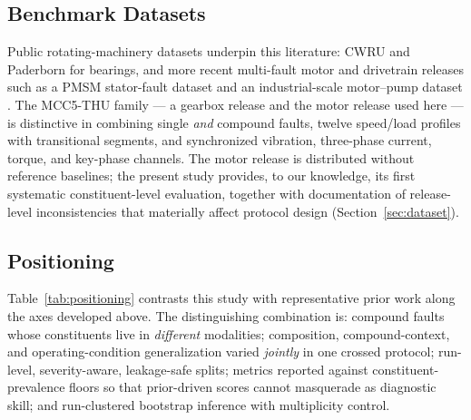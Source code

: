 \subsection{Benchmark Datasets}

Public rotating-machinery datasets underpin this literature: CWRU
\cite{smith2015cwru} and Paderborn \cite{lessmeier2016} for bearings, and more
recent multi-fault motor and drivetrain releases such as a PMSM stator-fault
dataset \cite{jung2023} and an industrial-scale motor--pump dataset
\cite{bruinsma2024}. The MCC5-THU family --- a gearbox release
\cite{chen2024gearbox} and the motor release used here \cite{chen2026,
mcc5motor_data} --- is distinctive in combining single \emph{and} compound
faults, twelve speed/load profiles with transitional segments, and synchronized
vibration, three-phase current, torque, and key-phase channels. The motor
release is distributed without reference baselines; the present study provides,
to our knowledge, its first systematic constituent-level evaluation, together
with documentation of release-level inconsistencies that materially affect
protocol design (Section~\ref{sec:dataset}).

\subsection{Positioning}

Table~\ref{tab:positioning} contrasts this study with representative prior
work along the axes developed above. The distinguishing combination is:
compound faults whose constituents live in \emph{different} modalities;
composition, compound-context, and operating-condition generalization varied
\emph{jointly} in one crossed protocol; run-level, severity-aware, leakage-safe
splits; metrics reported against constituent-prevalence floors so that
prior-driven scores cannot masquerade as diagnostic skill; and run-clustered
bootstrap inference with multiplicity control.

